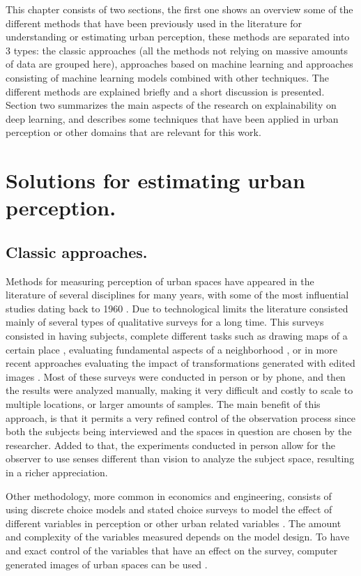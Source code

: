This chapter consists of two sections, the first one shows an overview some of the
different methods that have been previously used in the literature
for understanding or estimating urban perception, these methods are separated
into 3 types: the classic approaches (all the methods not relying on
massive amounts of data are grouped here), approaches based on machine learning and
approaches consisting of machine learning models combined with other techniques.
The different methods are explained briefly and a short discussion is presented.
Section two summarizes the main aspects of the research
on explainability on deep learning, and describes some techniques that have been applied
in urban perception or other domains that are relevant for this work.


\section{Solutions for estimating urban perception.}

\subsection{Classic approaches.}
Methods for measuring perception of urban spaces have appeared in the literature of several
disciplines for many years,  with some of the most influential studies dating back to 1960
\cite{lynch}. Due to technological limits the literature consisted mainly of several types of
qualitative surveys for a long time. This surveys consisted in having subjects, complete
different tasks such as drawing maps of a certain place \cite{lynch}, evaluating fundamental
aspects of a neighborhood \cite{nasar_perception}, or in more recent approaches evaluating
the impact of transformations generated with edited images \cite{jiang_minimizing}. Most of
these surveys were conducted in person or by phone, and then the results were analyzed manually,
making it very difficult and costly to scale to multiple locations, or larger amounts of samples.
The main benefit of this approach, is that it permits a very refined control of the observation process
since both the subjects being interviewed and the spaces in question are chosen by the researcher.
Added to that, the experiments conducted in person allow for the observer to use senses different
than vision to analyze the subject space, resulting in a richer appreciation.

Other methodology, more common in economics and engineering, consists of using discrete choice models
and stated choice surveys to model the effect of different variables in perception or other urban
related variables  \cite{rose_sc, iglesias_perception, torres_housing}. The amount and complexity of the
variables measured depends on the model design. To have and exact control of the variables that
have an effect on the survey, computer generated images of urban spaces can be used
\cite{iglesias_perception,torres_housing}.

